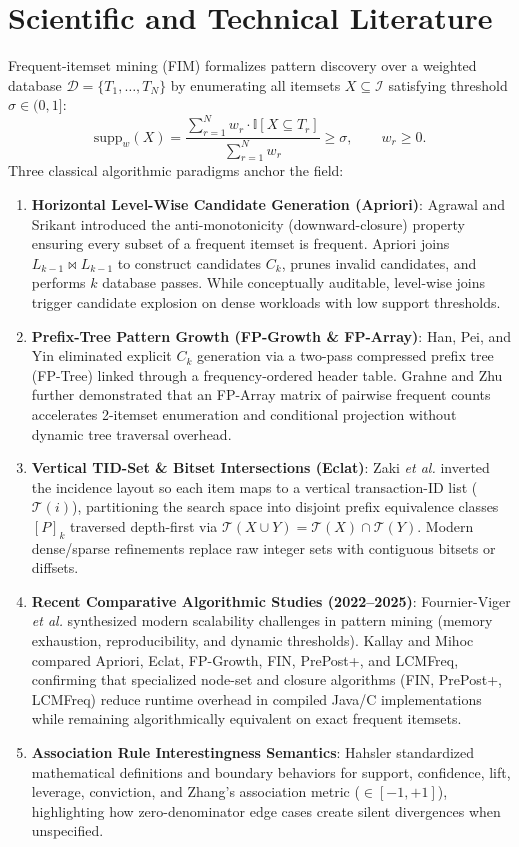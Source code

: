 \section{Scientific and Technical Literature}
Frequent-itemset mining (FIM) formalizes pattern discovery over a weighted database $\mathcal{D} = \{T_1, \dots, T_N\}$ by enumerating all itemsets $X \subseteq \mathcal{I}$ satisfying threshold $\sigma \in (0, 1]$:
\begin{equation}
\mathrm{supp}_w(X) = \frac{\sum_{r=1}^{N} w_r \cdot \mathbb{I}[X \subseteq T_r]}{\sum_{r=1}^{N} w_r} \ge \sigma, \qquad w_r \ge 0.
\end{equation}
Three classical algorithmic paradigms anchor the field:
\begin{enumerate}
  \item \textbf{Horizontal Level-Wise Candidate Generation (Apriori)}: Agrawal and Srikant \cite{agrawal1994} introduced the anti-monotonicity (downward-closure) property ensuring every subset of a frequent itemset is frequent. Apriori joins $L_{k-1} \bowtie L_{k-1}$ to construct candidates $C_k$, prunes invalid candidates, and performs $k$ database passes. While conceptually auditable, level-wise joins trigger candidate explosion on dense workloads with low support thresholds.
  \item \textbf{Prefix-Tree Pattern Growth (FP-Growth \& FP-Array)}: Han, Pei, and Yin \cite{han2000,han2004} eliminated explicit $C_k$ generation via a two-pass compressed prefix tree (FP-Tree) linked through a frequency-ordered header table. Grahne and Zhu \cite{grahne2005} further demonstrated that an FP-Array matrix of pairwise frequent counts accelerates 2-itemset enumeration and conditional projection without dynamic tree traversal overhead.
  \item \textbf{Vertical TID-Set \& Bitset Intersections (Eclat)}: Zaki \emph{et al.} \cite{zaki1997,zaki2000} inverted the incidence layout so each item maps to a vertical transaction-ID list ($\mathcal{T}(i)$), partitioning the search space into disjoint prefix equivalence classes $[P]_k$ traversed depth-first via $\mathcal{T}(X \cup Y) = \mathcal{T}(X) \cap \mathcal{T}(Y)$. Modern dense/sparse refinements replace raw integer sets with contiguous bitsets or diffsets.
  \item \textbf{Recent Comparative Algorithmic Studies (2022--2025)}: Fournier-Viger \emph{et al.} \cite{fournier2022} synthesized modern scalability challenges in pattern mining (memory exhaustion, reproducibility, and dynamic thresholds). Kallay and Mihoc \cite{kallay2025} compared Apriori, Eclat, FP-Growth, FIN, PrePost+, and LCMFreq, confirming that specialized node-set and closure algorithms (FIN, PrePost+, LCMFreq) reduce runtime overhead in compiled Java/C implementations while remaining algorithmically equivalent on exact frequent itemsets.
  \item \textbf{Association Rule Interestingness Semantics}: Hahsler \cite{hahsler} standardized mathematical definitions and boundary behaviors for support, confidence, lift, leverage, conviction, and Zhang's association metric ($\in [-1, +1]$), highlighting how zero-denominator edge cases create silent divergences when unspecified.
\end{enumerate}

